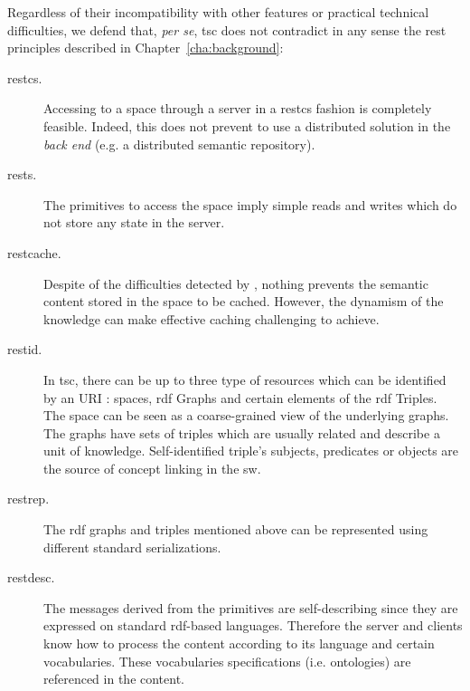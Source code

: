 Regardless of their incompatibility with other features or practical technical difficulties, %
we defend that, \emph{per se}, \ac{tsc} does not contradict in any sense the \ac{rest} principles described in Chapter~\ref{cha:background}:
\begin{description}
 \item[\ac{restcs}.] Accessing to a space through a server in a \ac{restcs} fashion is completely feasible.
		      Indeed, this does not prevent to use a distributed solution in the \emph{back end} (e.g. a distributed semantic repository).
 \item[\ac{rests}.] The primitives to access the space imply simple reads and writes which do not store any state in the server.
 \item[\ac{restcache}. ] Despite of the difficulties detected by \citet{fensel_tsc_2007}, nothing prevents the semantic content stored in the space to be cached.
                          However, the dynamism of the knowledge can make effective caching challenging to achieve.
	\item[\ac{restid}.]
			 In \ac{tsc}, there can be up to three type of resources which can be identified by an URI : spaces, \ac{rdf} Graphs and certain elements of the \ac{rdf} Triples.
	                 The space can be seen as a coarse-grained view of the underlying graphs.
	                 The graphs have sets of triples which are usually related and describe a unit of knowledge. %
	                 Self-identified triple's subjects, predicates or objects are the source of concept linking in the \ac{sw}.
	\item[\ac{restrep}.] The \ac{rdf} graphs and triples mentioned above can be represented using different standard serializations.
	\item[\ac{restdesc}.] The messages derived from the primitives are self-describing since they are expressed on standard \ac{rdf}-based languages. %
				Therefore the server and clients know how to process the content according to its language and certain vocabularies.
				These vocabularies specifications (i.e. ontologies) are referenced in the content.

\end{description}
